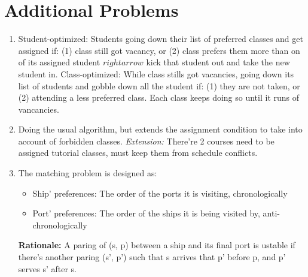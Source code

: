 \documentclass{article}
\begin{document}
\section{Additional Problems}
\begin{enumerate}[leftmargin=\labelsep]
  \item Student-optimized: Students going down their list of preferred classes and get assigned if: (1) class still got vacancy, or (2) class prefers them more than on of its assigned student $rightarrow$ kick that student out and take the new student in.
    Class-optimized: While class stills got vacancies, going down its list of students and gobble down all the student if: (1) they are not taken, or (2) attending a less preferred class. Each class keeps doing so until it runs of vancancies.
  \item Doing the usual algorithm, but extends the assignment condition to take into account of forbidden classes.
    \textit{Extension:} There're 2 courses need to be assigned tutorial classes, must keep them from schedule conflicts.
  \item The matching problem is designed as:
    \begin{itemize}
      \item Ship' preferences: The order of the ports it is visiting, chronologically
      \item Port' preferences: The order of the ships it is being visited by, anti-chronologically
    \end{itemize}
    \textbf{Rationale: } A paring of (s, p) between a ship and its final port is ustable if there's another paring (s', p') such that s arrives that p' before p, and p' serves s' after s.
\end{enumerate}
\end{document}
